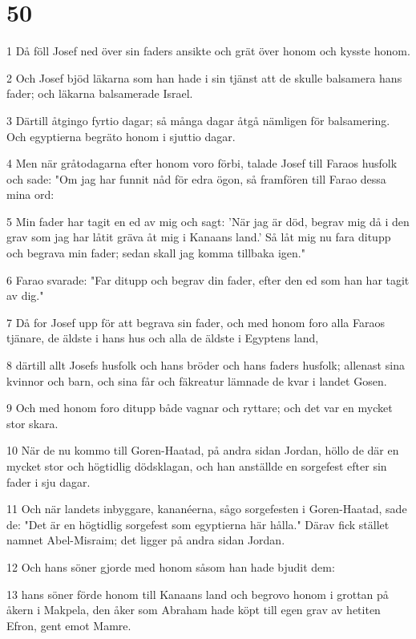 \chapter{50}

\par 1 Då föll Josef ned över sin faders ansikte och grät över honom och kysste honom.
\par 2 Och Josef bjöd läkarna som han hade i sin tjänst att de skulle balsamera hans fader; och läkarna balsamerade Israel.
\par 3 Därtill åtgingo fyrtio dagar; så många dagar åtgå nämligen för balsamering. Och egyptierna begräto honom i sjuttio dagar.
\par 4 Men när gråtodagarna efter honom voro förbi, talade Josef till Faraos husfolk och sade: "Om jag har funnit nåd för edra ögon, så framfören till Farao dessa mina ord:
\par 5 Min fader har tagit en ed av mig och sagt: 'När jag är död, begrav mig då i den grav som jag har låtit gräva åt mig i Kanaans land.' Så låt mig nu fara ditupp och begrava min fader; sedan skall jag komma tillbaka igen."
\par 6 Farao svarade: "Far ditupp och begrav din fader, efter den ed som han har tagit av dig."
\par 7 Då for Josef upp för att begrava sin fader, och med honom foro alla Faraos tjänare, de äldste i hans hus och alla de äldste i Egyptens land,
\par 8 därtill allt Josefs husfolk och hans bröder och hans faders husfolk; allenast sina kvinnor och barn, och sina får och fäkreatur lämnade de kvar i landet Gosen.
\par 9 Och med honom foro ditupp både vagnar och ryttare; och det var en mycket stor skara.
\par 10 När de nu kommo till Goren-Haatad, på andra sidan Jordan, höllo de där en mycket stor och högtidlig dödsklagan, och han anställde en sorgefest efter sin fader i sju dagar.
\par 11 Och när landets inbyggare, kananéerna, sågo sorgefesten i Goren-Haatad, sade de: "Det är en högtidlig sorgefest som egyptierna här hålla." Därav fick stället namnet Abel-Misraim; det ligger på andra sidan Jordan.
\par 12 Och hans söner gjorde med honom såsom han hade bjudit dem:
\par 13 hans söner förde honom till Kanaans land och begrovo honom i grottan på åkern i Makpela, den åker som Abraham hade köpt till egen grav av hetiten Efron, gent emot Mamre.
